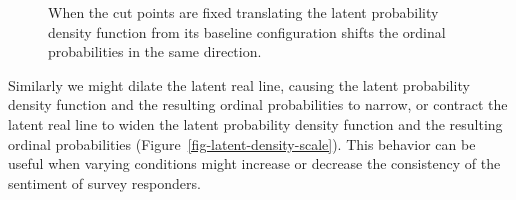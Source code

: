 \documentclass[
  letterpaper,
  DIV=11,
  numbers=noendperiod]{scrartcl}
\begin{document}
\begin{figure}


\caption{\label{fig-latent-density-translate}When the cut points are
fixed translating the latent probability density function from its
baseline configuration shifts the ordinal probabilities in the same
direction.}

\end{figure}%

Similarly we might dilate the latent real line, causing the latent
probability density function and the resulting ordinal probabilities to
narrow, or contract the latent real line to widen the latent probability
density function and the resulting ordinal probabilities
(Figure~\ref{fig-latent-density-scale}). This behavior can be useful
when varying conditions might increase or decrease the consistency of
the sentiment of survey responders.
\end{document}

